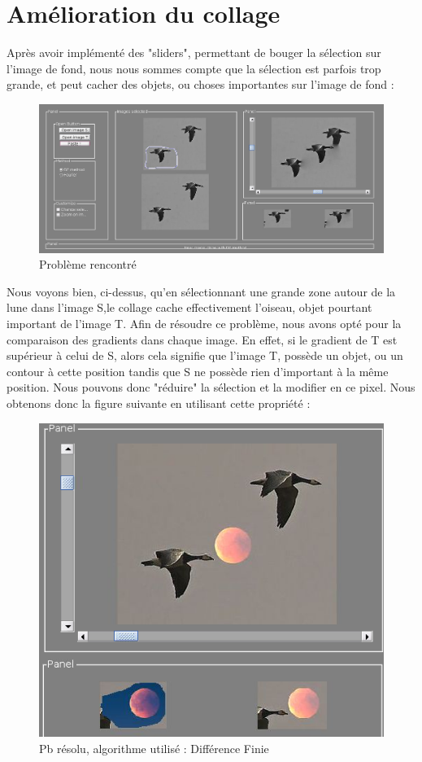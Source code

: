 \section{Amélioration du collage}
Après avoir implémenté des "sliders", permettant de bouger la sélection sur l'image de fond, nous nous sommes compte que la sélection est parfois trop grande, et peut cacher des objets, ou choses importantes sur l'image de fond : 
\begin{figure}[!htb]
\centering
\includegraphics[scale=0.4]{Images/pb.png}
\caption{Problème rencontré}
\end{figure}
Nous voyons bien, ci-dessus, qu'en sélectionnant une grande zone autour de la lune dans l'image S,le collage cache effectivement l'oiseau, objet pourtant important de l'image T. Afin de résoudre ce problème, nous avons opté pour la comparaison des gradients dans chaque image. En effet, si le gradient de T est supérieur à celui de S, alors cela signifie que l'image T, possède un objet, ou un contour à cette position tandis que S ne possède rien d'important à la même position. Nous pouvons donc "réduire" la sélection et la modifier en ce pixel. Nous obtenons donc la figure suivante en utilisant cette propriété :
\begin{figure}[!htb]
\centering
\includegraphics[scale=0.5]{Images/sol.png}
\caption{Pb résolu, algorithme utilisé : Différence Finie}
\end{figure}\newpage
